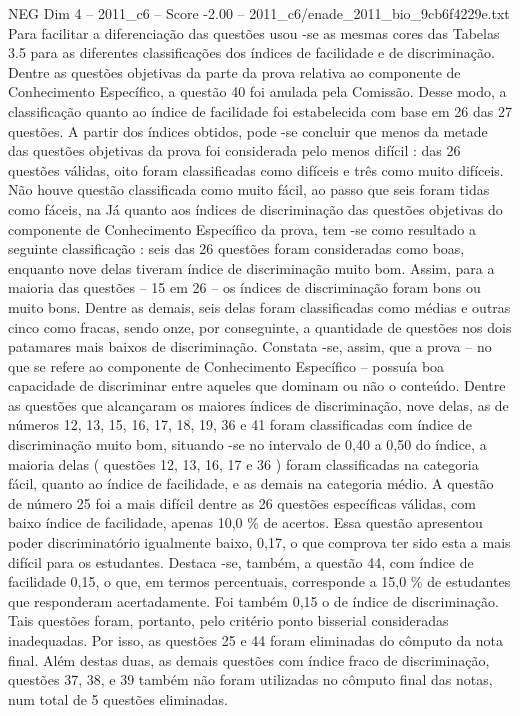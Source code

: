 \begin{textsample}{NEG Dim 4 – 2011\_c6 – Score -2.00 – 2011\_c6/enade\_2011\_bio\_9cb6f4229e.txt}
Para facilitar a diferenciação das questões usou -se as mesmas cores das Tabelas 3.5 para as diferentes classificações dos índices de facilidade e de discriminação.
Dentre as questões objetivas da parte da prova relativa ao componente de Conhecimento Específico, a questão 40 foi anulada pela Comissão.
Desse modo, a classificação quanto ao índice de facilidade foi estabelecida com base em 26 das 27 questões.
A partir dos índices obtidos, pode -se concluir que menos da metade das questões objetivas da prova foi considerada pelo menos difícil : das 26 questões válidas, oito foram classificadas como difíceis e três como muito difíceis.
Não houve questão classificada como muito fácil, ao passo que seis foram tidas como fáceis, na Já quanto aos índices de discriminação das questões objetivas do componente de Conhecimento Específico da prova, tem -se como resultado a seguinte classificação : seis das 26 questões foram consideradas como boas, enquanto nove delas tiveram índice de discriminação muito bom.
Assim, para a maioria das questões – 15 em 26 – os índices de discriminação foram bons ou muito bons.
Dentre as demais, seis delas foram classificadas como médias e outras cinco como fracas, sendo onze, por conseguinte, a quantidade de questões nos dois patamares mais baixos de discriminação.
Constata -se, assim, que a prova – no que se refere ao componente de Conhecimento Específico – possuía boa capacidade de discriminar entre aqueles que dominam ou não o conteúdo.
Dentre as questões que alcançaram os maiores índices de discriminação, nove delas, as de números 12, 13, 15, 16, 17, 18, 19, 36 e 41 foram classificadas com índice de discriminação muito bom, situando -se no intervalo de 0,40 a 0,50 do índice, a maioria delas ( questões 12, 13, 16, 17 e 36 ) foram classificadas na categoria fácil, quanto ao índice de facilidade, e as demais na categoria médio.
A questão de número 25 foi a mais difícil dentre as 26 questões específicas válidas, com baixo índice de facilidade, apenas 10,0 \% de acertos.
Essa questão apresentou poder discriminatório igualmente baixo, 0,17, o que comprova ter sido esta a mais difícil para os estudantes.
Destaca -se, também, a questão 44, com índice de facilidade 0,15, o que, em termos percentuais, corresponde a 15,0 \% de estudantes que responderam acertadamente.
Foi também 0,15 o de índice de discriminação.
Tais questões foram, portanto, pelo critério ponto bisserial consideradas inadequadas.
Por isso, as questões 25 e 44 foram eliminadas do cômputo da nota final.
Além destas duas, as demais questões com índice fraco de discriminação, questões 37, 38, e 39 também não foram utilizadas no cômputo final das notas, num total de 5 questões eliminadas.

\end{textsample}
